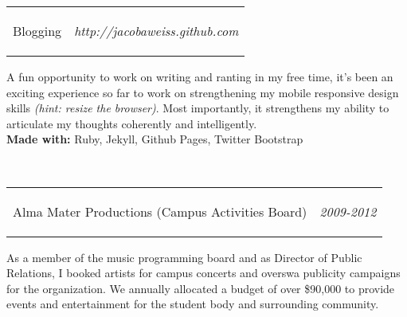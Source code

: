 \documentclass[11pt]{article}
\makeatletter
\newcommand{\headerrow}[2]
{\begin{tabular*}{\linewidth}{l@{\extracolsep{\fill}}r}
	#1 &
	#2 \\
\end{tabular*}}
\makeatother
\begin{document}
\headerrow
	{\begin{Large}Blogging\end{Large}}
	{\textit{http://jacobaweiss.github.com}}
	\begin{normalsize}
	\hspace*{1.5em}A fun opportunity to work on writing and ranting in my free time, it's been an exciting experience so far to work on strengthening my mobile responsive design skills {\textit{(hint: resize the browser)}}. Most importantly, it strengthens my ability to articulate my thoughts coherently and intelligently.\\
	{\bf Made with:} Ruby, Jekyll, Github Pages, Twitter Bootstrap
	\end{normalsize} \\
	
	\headerrow
	{\begin{Large}Alma Mater Productions (Campus Activities Board)\end{Large}}
	{\textit{2009-2012}}
	\begin{normalsize}
	\hspace*{1.5em}As a member of the music programming board and as Director of Public Relations, I booked artists for campus concerts and overswa publicity campaigns for the organization. We annually allocated a budget of over \$90,000 to provide events and entertainment for the student body and surrounding community. \\
	\end{normalsize}
\end{document}
